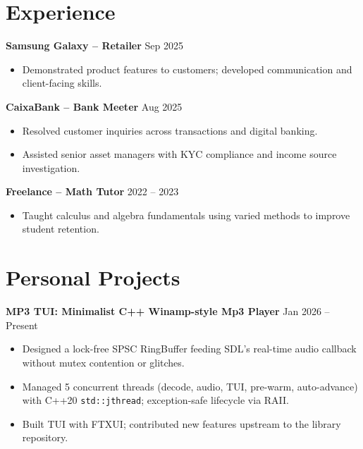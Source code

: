 \documentclass[11pt, a4paper]{article}
\begin{document}
\section{Experience}

\textbf{Samsung Galaxy -- Retailer} \hfill Sep 2025
\begin{itemize}
    \item Demonstrated product features to customers; developed communication and client-facing skills.
\end{itemize}

\vspace{0.8em}

\textbf{CaixaBank -- Bank Meeter} \hfill Aug 2025
\begin{itemize}
    \item Resolved customer inquiries across transactions and digital banking.
    \item Assisted senior asset managers with KYC compliance and income source investigation.
\end{itemize}

\vspace{0.8em}

\textbf{Freelance -- Math Tutor} \hfill 2022 -- 2023
\begin{itemize}
    \item Taught calculus and algebra fundamentals using varied methods to improve student retention.
\end{itemize}

\section{Personal Projects}

\textbf{MP3 TUI: Minimalist C++ Winamp-style Mp3 Player} \hfill Jan 2026 -- Present
\begin{itemize}
    \item Designed a lock-free SPSC RingBuffer feeding SDL's real-time audio callback without mutex contention or glitches.
    \item Managed 5 concurrent threads (decode, audio, TUI, pre-warm, auto-advance) with C++20 \texttt{std::jthread}; exception-safe lifecycle via RAII.
    \item Built TUI with FTXUI; contributed new features upstream to the library repository.
\end{itemize}
\end{document}
